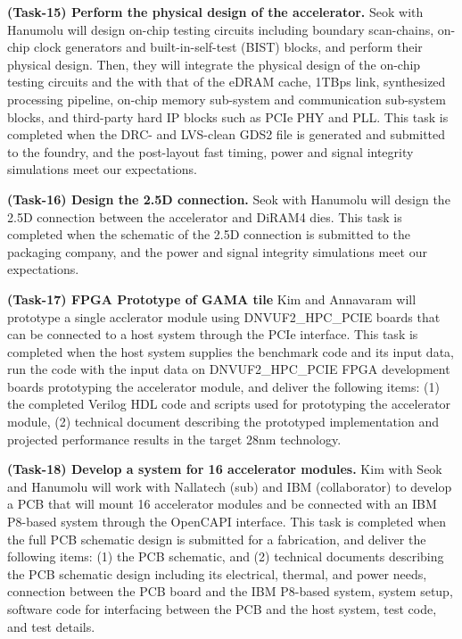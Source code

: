 \vspace{3pt}
\noindent
\textbf{(Task-15) Perform the physical design of the accelerator.} 
Seok with Hanumolu will design on-chip testing circuits including boundary scan-chains, on-chip clock generators and built-in-self-test (BIST) blocks, and perform their physical design.
Then, they will integrate the physical design of the on-chip testing circuits and the with that of the eDRAM cache, 1TBps link, synthesized processing pipeline, on-chip memory sub-system and communication sub-system blocks, and third-party hard IP blocks such as PCIe PHY and PLL.
This task is completed when the DRC- and LVS-clean GDS2 file is generated and submitted to the foundry, and the post-layout fast timing, power and signal integrity simulations meet our expectations.


\vspace{3pt}
\noindent
\textbf{(Task-16) Design the 2.5D connection.} 
Seok with Hanumolu will design the 2.5D connection between the accelerator and DiRAM4 dies.
This task is completed when the schematic of the 2.5D connection is submitted to the packaging company, and the power and signal integrity simulations meet our expectations.


\vspace{3pt}
\noindent
\textbf{(Task-17) FPGA Prototype of GAMA tile}
Kim and Annavaram will prototype a single acclerator module using DNVUF2\_HPC\_PCIE boards that can be connected to a host system through the PCIe interface.
This task is completed when the host system supplies the benchmark code and its input data, run the code with the input data on DNVUF2\_HPC\_PCIE FPGA development boards prototyping the accelerator module, and deliver the following items:
(1) the completed Verilog HDL code and scripts used for prototyping the accelerator module,  
(2) technical document describing the prototyped implementation and projected performance results in the target 28nm technology.


\vspace{3pt}
\noindent
\textbf{(Task-18) Develop a system for 16 accelerator modules.}
Kim with Seok and Hanumolu will work with Nallatech (sub) and IBM (collaborator) to develop a PCB that will mount 16 accelerator modules and be connected with an IBM P8-based system through the OpenCAPI interface.
This task is completed when the full PCB schematic design is submitted for a fabrication, and deliver the following items:
(1) the PCB schematic, and
(2) technical documents describing the PCB schematic design including its electrical, thermal, and power needs, connection between the PCB board and the IBM P8-based system, 
system setup, software code for interfacing between the PCB and the host system, test code, and test details. 



